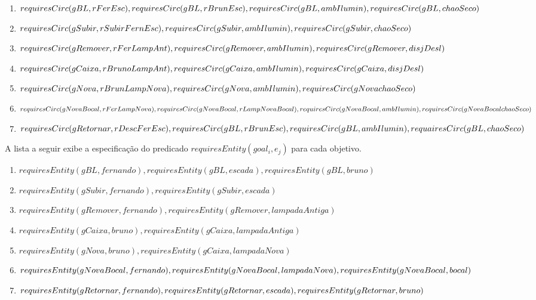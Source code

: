 \begin{enumerate}
	\item $requiresCirc(gBL,rFerEsc), requiresCirc(gBL,rBrunEsc), \\ requiresCirc(gBL, ambIlumin), requiresCirc(gBL,chaoSeco)$
	\item $requiresCirc(gSubir,rSubirFernEsc), requiresCirc(gSubir, ambIlumin), \\ requiresCirc(gSubir,chaoSeco) $
	\item $requiresCirc(gRemover,rFerLampAnt), requiresCirc(gRemover, ambIlumin), \\ requiresCirc(gRemover,disjDesl)$
	\item $requiresCirc(gCaixa,rBrunoLampAnt), requiresCirc(gCaixa, ambIlumin), \\ requiresCirc(gCaixa, disjDesl)$
	\item $requiresCirc(gNova,rBrunLampNova), requiresCirc(gNova,ambIlumin), \\ requiresCirc(gNova chaoSeco)$
	\item $requiresCirc(gNovaBocal,rFerLampNova), requiresCirc(gNovaBocal,rLampNovaBocal), \\ requiresCirc(gNovaBocal,ambIlumin), requiresCirc(gNovaBocal chaoSeco)$
	\item $requiresCirc(gRetornar,rDescFerEsc), requiresCirc(gBL,rBrunEsc), \\ requiresCirc(gBL, ambIlumin), requairesCirc(gBL,chaoSeco)$
\end{enumerate}

A lista a seguir exibe a especificação do predicado $requiresEntity(goal_i,e_j)$ para cada objetivo.

\begin{enumerate}
	\item $requiresEntity(gBL,fernando),requiresEntity(gBL,escada),requiresEntity(gBL,bruno)$
	\item $requiresEntity(gSubir,fernando),requiresEntity(gSubir,escada)$
	\item $requiresEntity(gRemover,fernando),requiresEntity(gRemover,lampadaAntiga)$
	\item $requiresEntity(gCaixa,bruno),requiresEntity(gCaixa,lampadaAntiga)$
	\item $requiresEntity(gNova,bruno),requiresEntity(gCaixa,lampadaNova)$
	\item $requiresEntity(gNovaBocal,fernando),requiresEntity(gNovaBocal,lampadaNova), \\ requiresEntity(gNovaBocal,bocal)$
	\item $requiresEntity(gRetornar,fernando),requiresEntity(gRetornar,escada), \\ requiresEntity(gRetornar,bruno)$
\end{enumerate}

